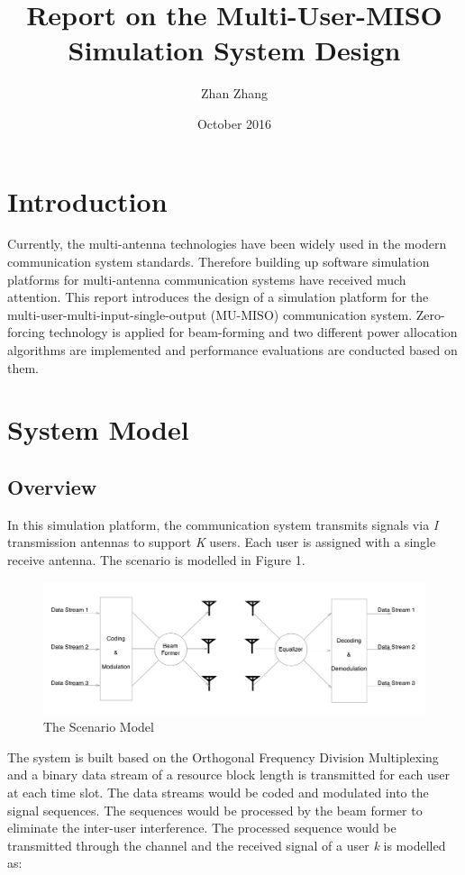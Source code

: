 \documentclass{article}
\title{Report on the Multi-User-MISO Simulation System Design}
\author{Zhan Zhang}
\date{October 2016}
\begin{document}
\maketitle

\section{Introduction}
Currently, the multi-antenna technologies have been widely used in the modern communication system standards.
Therefore building up software simulation platforms for multi-antenna communication systems have received much attention.
This report introduces the design of a simulation platform for
the multi-user-multi-input-single-output (MU-MISO) communication system.
Zero-forcing technology is applied for beam-forming and two different
power allocation algorithms are implemented and performance evaluations are conducted based on them.

\section{System Model}
\subsection{Overview}
In this simulation platform, the communication system transmits signals via \textit{I} transmission antennas to support \textit{K} users.
Each user is assigned with a single receive antenna. The scenario is modelled in Figure 1.
\begin{figure}[ht]
\centering
\includegraphics[scale=0.33]{Scenario.png}
\caption{The Scenario Model}
\label{fig:Scenario}
\end{figure}

\noindent
The system is built based on the Orthogonal Frequency Division Multiplexing and a binary data stream of a resource block length is transmitted for each user at each time slot.
The data streams would be coded and modulated into the signal sequences.
The sequences would be processed by the beam former to eliminate the inter-user interference.
The processed sequence would be transmitted through the channel and the received signal of a user \textit{k} is modelled as:
\end{document}
